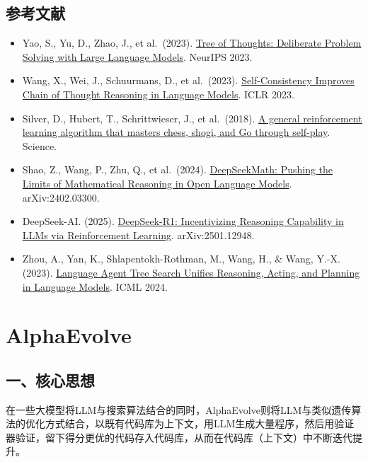 \hypertarget{ux53c2ux8003ux6587ux732e-120}{%
\subsection{参考文献}\label{ux53c2ux8003ux6587ux732e-120}}

\vspace{0.25em}
\begin{itemize}
\tightlist
\item
  Yao, S., Yu, D., Zhao, J., et al.~(2023). \href{https://arxiv.org/abs/2305.10601}{Tree of Thoughts: Deliberate Problem Solving with Large Language Models}. NeurIPS 2023.
\item
  Wang, X., Wei, J., Schuurmans, D., et al.~(2023). \href{https://openreview.net/forum?id=1PL1NIMMrw}{Self-Consistency Improves Chain of Thought Reasoning in Language Models}. ICLR 2023.
\item
  Silver, D., Hubert, T., Schrittwieser, J., et al.~(2018). \href{https://www.science.org/doi/10.1126/science.aar6404}{A general reinforcement learning algorithm that masters chess, shogi, and Go through self-play}. Science.
\item
  Shao, Z., Wang, P., Zhu, Q., et al.~(2024). \href{https://arxiv.org/abs/2402.03300}{DeepSeekMath: Pushing the Limits of Mathematical Reasoning in Open Language Models}. arXiv:2402.03300.
\item
  DeepSeek-AI. (2025). \href{https://arxiv.org/abs/2501.12948}{DeepSeek-R1: Incentivizing Reasoning Capability in LLMs via Reinforcement Learning}. arXiv:2501.12948.
\item
  Zhou, A., Yan, K., Shlapentokh-Rothman, M., Wang, H., \& Wang, Y.-X. (2023). \href{https://arxiv.org/abs/2310.04406}{Language Agent Tree Search Unifies Reasoning, Acting, and Planning in Language Models}. ICML 2024.
\end{itemize}

\clearpage

\hypertarget{alphaevolve}{%
\section{AlphaEvolve}\label{alphaevolve}}

\hypertarget{ux4e00ux6838ux5fc3ux601dux60f3-10}{%
\subsection{一、核心思想}\label{ux4e00ux6838ux5fc3ux601dux60f3-10}}

在一些大模型将LLM与搜索算法结合的同时，AlphaEvolve则将LLM与类似遗传算法的优化方式结合，以既有代码库为上下文，用LLM生成大量程序，然后用验证器验证，留下得分更优的代码存入代码库，从而在代码库（上下文）中不断迭代提升。

